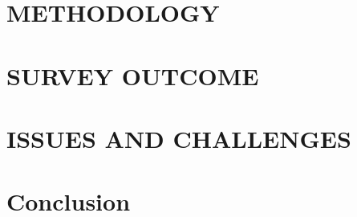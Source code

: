 \section{METHODOLOGY}



\section{SURVEY OUTCOME}



\section{ISSUES AND CHALLENGES}





\section{Conclusion}





